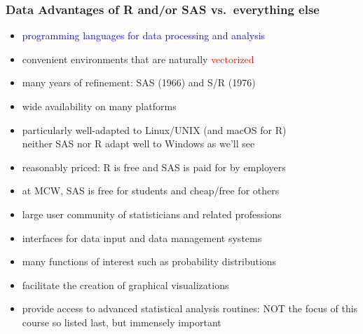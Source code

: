 \documentclass[11pt,pdftex,dvipsnames,usenames,helvetica]{beamer}
\begin{document}
\begin{frame}\frametitle{Data Advantages of R and/or SAS vs.\ everything else}
\begin{itemize}
\item \textcolor{blue}{programming languages for data processing and analysis} 
\item convenient environments that are naturally \textcolor{red}{vectorized}
\item many years of refinement: SAS (1966) and S/R (1976)
\item wide availability on many platforms
\item particularly well-adapted to Linux/UNIX (and macOS for R)\\
neither SAS nor R adapt well to Windows as we'll see
\item reasonably priced: R is free and SAS is paid for by employers
\item at MCW, SAS is free for students and cheap/free for others
\item large user community of statisticians and related professions
\item interfaces for data input and data management systems
\item many functions of interest such as probability distributions
\item facilitate the creation of graphical visualizations 
\item provide access to advanced statistical analysis routines:
NOT the focus of this course so listed last, but immensely important
\end{itemize}
\end{frame}
\end{document}
